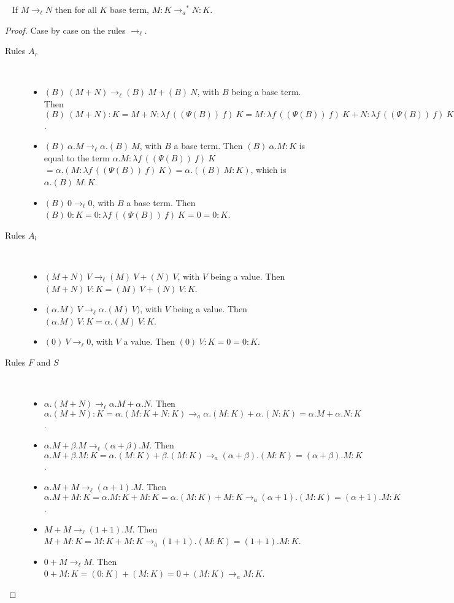 \documentclass{LMCS}
\makeatletter
\newcommand{\recap}[2]{\medskip\noindent{\bf #1 \ref{#2}.}~}
\newcommand{\xto}[1]{\ensuremath{\rightarrow_{#1}}}
\newcommand{\tolinred}{\xto{\ell}}
\newcommand{\toalgred}{\xto{a}}
\newcommand{\stoalgred}{\ensuremath{\xto{a}^{\ast}}}
\def\mynobreakpar{\par\nobreak\@afterheading}
\makeatother
\begin{document}
\recap{Lemma}{lem:lemma3alg}
If $M\tolinred N$ then for all $K$ base term, $M:K\stoalgred N:K$.
\begin{proof}
  Case by case on the rules $\tolinred$.
  \begin{description}
    \item[Rules $A_r$]~
      \begin{itemize}
	\item $(B)~(M+N)\tolinred (B)~M+(B)~N$, with $B$ being a base term. Then $(B)~(M+N):K= M+N :\lambda f\,((\Psi(B))~f)~K = M :\lambda f\,((\Psi(B))~f)~K  + N:\lambda f\,((\Psi(B))~f)~K  = (B)~M : K + (B)~N : K = (B)~M+  (B)~N : K$.
	\item $(B)~\alpha.M\tolinred\alpha.(B)~M$, with $B$ a base
	  term. Then $(B)~\alpha.M:K$ is equal to the term
	  $\alpha.M:\lambda f\,((\Psi(B))~f)~K$ $= \alpha.(M : \lambda
	  f\,((\Psi(B))~f)~K) = \alpha.((B)~M:K)$, which is $\alpha.(B)~M : K$.
	\item $(B)~0\tolinred 0$, with $B$ a base term. Then $(B)~0:K=0 :\lambda f\,((\Psi(B))~f)~K = 0 =0:K$.
      \end{itemize}
    \item[Rules $A_l$]~\mynobreakpar
      \begin{itemize}
	\item $(M+N)~V\tolinred (M)~V+(N)~V$, with $V$ being a value. Then $(M+N)~V : K= (M)~V+(N)~V : K$.
	\item $(\alpha.M)~V\tolinred\alpha.(M)~V)$, with $V$ being a value. Then $(\alpha.M)~V : K = \alpha.(M)~V : K$.
	\item $(0)~V\tolinred 0$, with $V$ a value. Then $(0)~V : K = 0 = 0:K$.
      \end{itemize}
    \item[Rules $F$ and $S$]~
      \begin{itemize}
	\item $\alpha.(M+N)\tolinred \alpha.M+\alpha.N$. Then $\alpha.(M+N):K=\alpha.(M:K+N:K)\toalgred\alpha.(M:K)+\alpha.(N:K)=\alpha.M+\alpha.N:K$.
	\item $\alpha.M+\beta.M\tolinred(\alpha+\beta).M$. Then $\alpha.M+\beta.M:K=\alpha.(M:K)+\beta.(M:K)\toalgred(\alpha+\beta).(M:K)=(\alpha+\beta).M:K$.
	\item $\alpha.M+M\tolinred(\alpha+1).M$. Then  $\alpha.M+M:K=\alpha.M:K+M:K=\alpha.(M:K)+M:K\toalgred(\alpha+1).(M:K)=(\alpha+1).M:K$.
	\item $M+M\tolinred(1+1).M$. Then  $M+M:K=M:K+M:K\toalgred(1+1).(M:K)=(1+1).M:K$.
	\item $0+M\tolinred M$. Then  $0+M:K=(0:K)+(M:K)=0+(M:K)\toalgred M:K$.

\end{itemize}
\end{description}
\end{proof}
\end{document}

